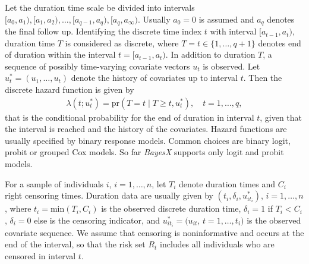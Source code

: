 \documentclass[11pt,a4paper,twoside]{bayesxarticle}
\begin{document}
Let the duration time scale be divided into intervals $\lbrack
a_{0},a_{1}),\lbrack a_{1},a_{2}),\ldots, \lbrack a_{q-1},a_{q}),
\lbrack a_{q},a_{\infty}).$ Usually $a_{0}=0$ is assumed and
$a_{q}$ denotes the final follow up. Identifying the discrete time
index $t$ with interval $\lbrack a_{t-1},a_{t}),$ duration time
$T$ is considered as discrete, where $T=t\in \{1,\ldots,q+1\}$
denotes end of duration within the interval $t=\lbrack
a_{t-1},a_{t}).$ In addition to duration $T$, a sequence of
possibly time-varying covariate vectors $u_t$ is observed. Let
$u_t^*=(u_{1},\ldots,u_{t})$ denote the history of covariates up
to interval $t$. Then the discrete hazard function is given by
\begin{eqnarray*}
\lambda(t;u_t^*)=\mbox{pr}(T=t\mid T \geq t,u_t^*), \quad
t=1,\ldots,q,
\end{eqnarray*}
that is the conditional probability for the end of duration in
interval $t$, given that the interval is reached and the history
of the covariates. Hazard functions are usually specified by
binary response models. Common choices are binary logit, probit or
grouped Cox models. So far {\em BayesX} supports only logit and
probit models.

For a sample of individuals $i$, $i=1,\ldots,n$, let $T_{i}$
denote duration times and $C_{i}$ right censoring times. Duration
data are usually given by $(t_{i},\delta_{i},u_{it_{i}}^*)$, $i =
1,\ldots,n$, where $t_{i}=\mbox{min}(T_{i},C_{i})$ is the observed
discrete duration time, $\delta_{i}=1$ if $T_{i}<C_{i}$,
$\delta_{i}=0$ else is the censoring indicator, and
$u_{it_{i}}^*=(u_{it}$, $t=1,\ldots,t_{i})$ is the observed
covariate sequence. We assume that censoring is noninformative and
occurs at the end of the interval, so that the risk set $R_{t}$
includes all individuals who are censored in interval $t$.
\end{document}
